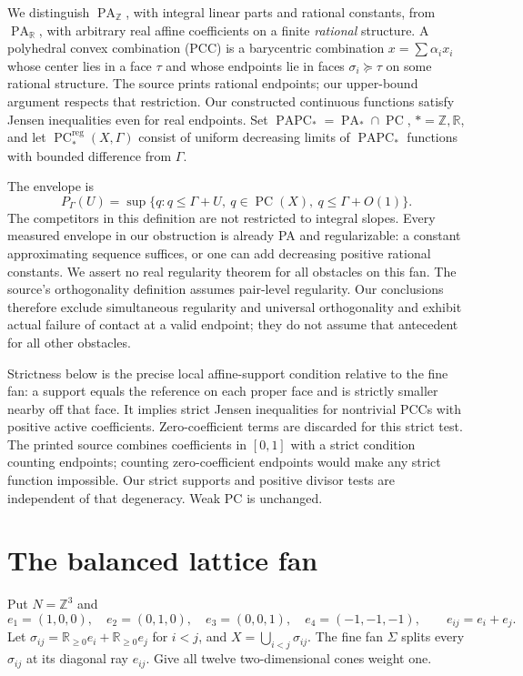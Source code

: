 \documentclass[11pt]{article}
\newcommand{\R}{\mathbb R}
\newcommand{\Z}{\mathbb Z}
\newcommand{\PC}{\operatorname{PC}}
\newcommand{\PA}{\operatorname{PA}}
\newcommand{\PAPC}{\operatorname{PAPC}}
\newcommand{\reg}{\mathrm{reg}}
\begin{document}
We distinguish $\PA_{\Z}$, with integral linear parts and rational constants, from $\PA_{\R}$, with arbitrary real affine coefficients on a finite \emph{rational} structure. A polyhedral convex combination (PCC) is a barycentric combination $x=\sum\alpha_i x_i$ whose center lies in a face $\tau$ and whose endpoints lie in faces $\sigma_i\succeq\tau$ on some rational structure. The source prints rational endpoints; our upper-bound argument respects that restriction. Our constructed continuous functions satisfy Jensen inequalities even for real endpoints. Set $\PAPC_*=\PA_*\cap\PC$, $*=\Z,\R$, and let $\PC^{\reg}_*(X,\Gamma)$ consist of uniform decreasing limits of $\PAPC_*$ functions with bounded difference from $\Gamma$.

The envelope is
\begin{equation}\label{envelope}
 P_\Gamma(U)=\sup\{q:q\leq\Gamma+U,\ q\in\PC(X),\ q\leq\Gamma+O(1)\}.
\end{equation}
The competitors in this definition are not restricted to integral slopes. Every measured envelope in our obstruction is already PA and regularizable: a constant approximating sequence suffices, or one can add decreasing positive rational constants. We assert no real regularity theorem for all obstacles on this fan. The source's orthogonality definition assumes pair-level regularity. Our conclusions therefore exclude simultaneous regularity and universal orthogonality and exhibit actual failure of contact at a valid endpoint; they do not assume that antecedent for all other obstacles.

Strictness below is the precise local affine-support condition relative to the fine fan: a support equals the reference on each proper face and is strictly smaller nearby off that face. It implies strict Jensen inequalities for nontrivial PCCs with positive active coefficients. Zero-coefficient terms are discarded for this strict test. The printed source combines coefficients in $[0,1]$ with a strict condition counting endpoints; counting zero-coefficient endpoints would make any strict function impossible. Our strict supports and positive divisor tests are independent of that degeneracy. Weak PC is unchanged.

\section{The balanced lattice fan}
Put $N=\Z^3$ and
\[e_1=(1,0,0),\quad e_2=(0,1,0),\quad e_3=(0,0,1),\quad e_4=(-1,-1,-1),\qquad e_{ij}=e_i+e_j.\]
Let $\sigma_{ij}=\R_{\geq0}e_i+\R_{\geq0}e_j$ for $i<j$, and $X=\bigcup_{i<j}\sigma_{ij}$. The fine fan $\Sigma$ splits every $\sigma_{ij}$ at its diagonal ray $e_{ij}$. Give all twelve two-dimensional cones weight one.
\end{document}
